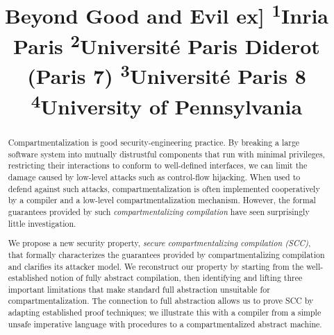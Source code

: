 \documentclass[10pt, conference, compsocconf, letterpaper, times]{IEEEtran}
\begin{document}
\title{{\Huge\bf Beyond Good and Evil}
\1ex] \textsuperscript{1}Inria Paris\qquad
  \textsuperscript{2}Universit\'{e} Paris Diderot (Paris 7)\qquad
  \textsuperscript{3}Universit\'{e} Paris 8\qquad
  \textsuperscript{4}University of Pennsylvania
\fi
}

\maketitle

\begin{abstract}
Compartmentalization is good security-engineering practice. By
breaking a large software system into mutually distrustful components
that run with minimal privileges, restricting their interactions to
conform to well-defined interfaces, we can limit the damage caused by
low-level attacks such as control-flow hijacking.  When used to defend
against such attacks, compartmentalization is often implemented
cooperatively by a compiler and a low-level compartmentalization
mechanism. However, the formal guarantees provided by such {\em
  compartmentalizing compilation} have seen surprisingly little
investigation.

We propose a new security property, \emph{secure compartmentalizing
  compilation (SCC)}, that formally characterizes the guarantees
provided by compartmentalizing compilation and clarifies its attacker
model. We reconstruct our property by starting from the
well-established notion of fully abstract compilation, then
identifying and lifting three important limitations that make standard
full abstraction unsuitable for compartmentalization. The connection
to full abstraction allows us to prove SCC by adapting established
proof techniques; we illustrate this with a compiler from a simple
unsafe imperative language with procedures to a compartmentalized
abstract machine.
\end{abstract}

\ifsooner
{}
\fi







\ifsooner
{}
\fi
\end{document}
